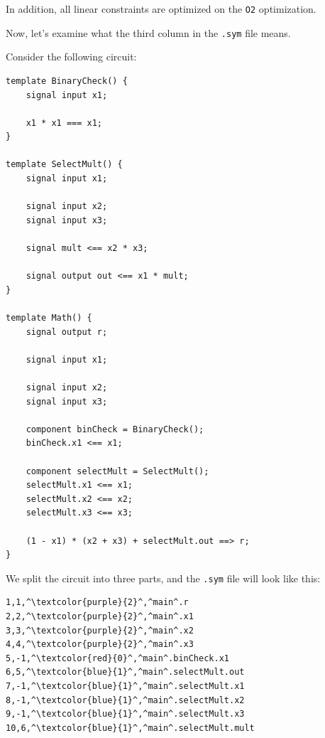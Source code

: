 \documentclass[../lecture-notes-148x210.tex]{subfiles}
\begin{document}
\begin{remark}
    In addition, all linear constraints are optimized on the \texttt{O2} optimization.
\end{remark}

Now, let's examine what the third column in the \texttt{.sym} file means.

Consider the following circuit:

\begin{lstlisting}[language=Circom,basicstyle=\ttfamily\footnotesize]
template BinaryCheck() {
    signal input x1;

    x1 * x1 === x1;
}

template SelectMult() {
    signal input x1;

    signal input x2;
    signal input x3;

    signal mult <== x2 * x3;

    signal output out <== x1 * mult;
}

template Math() {
    signal output r;

    signal input x1;

    signal input x2;
    signal input x3;

    component binCheck = BinaryCheck();
    binCheck.x1 <== x1;

    component selectMult = SelectMult();
    selectMult.x1 <== x1;
    selectMult.x2 <== x2;
    selectMult.x3 <== x3;

    (1 - x1) * (x2 + x3) + selectMult.out ==> r;
}
\end{lstlisting}

We split the circuit into three parts, and the \texttt{.sym} file will look like this:

\begin{center}
    \begin{tcolorbox}[enhanced,
        width=0.5\textwidth,
        title=\textbf{\footnotesize.sym file for $x_1? \; x_2 \times x_3 : x_2+x_3$ with templates},
        coltitle=gray!25!black,
        attach boxed title to top center={yshift=-2mm,yshifttext=-1mm},
        boxed title style={size=small,colframe=gray!75!black,
        colback=blue!30!white,boxrule=1pt},
        top=-0.35cm,
        bottom=-0.35cm]
        \begin{lstlisting}[language=Circom,numbers=none,basicstyle=\ttfamily\footnotesize,escapechar=^]
1,1,^\textcolor{purple}{2}^,^main^.r
2,2,^\textcolor{purple}{2}^,^main^.x1
3,3,^\textcolor{purple}{2}^,^main^.x2
4,4,^\textcolor{purple}{2}^,^main^.x3
5,-1,^\textcolor{red}{0}^,^main^.binCheck.x1
6,5,^\textcolor{blue}{1}^,^main^.selectMult.out
7,-1,^\textcolor{blue}{1}^,^main^.selectMult.x1
8,-1,^\textcolor{blue}{1}^,^main^.selectMult.x2
9,-1,^\textcolor{blue}{1}^,^main^.selectMult.x3
10,6,^\textcolor{blue}{1}^,^main^.selectMult.mult
        \end{lstlisting}
    \end{tcolorbox}
\end{center}
\end{document}
